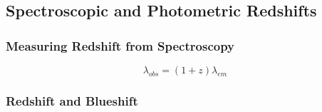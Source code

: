 \documentclass{beamer}
\begin{document}
\subsection{Spectroscopic and Photometric Redshifts}
\begin{frame}
	\frametitle{Measuring Redshift from Spectroscopy}
    \begin{figure}
    \end{figure}
    \begin{equation}
        \lambda_{obs} = (1+z)\lambda_{em}
    \end{equation}
    \end{frame}
\begin{frame}
	\frametitle{Redshift and Blueshift}
    \begin{figure}
    \end{figure}

    \end{frame}
\end{document}
